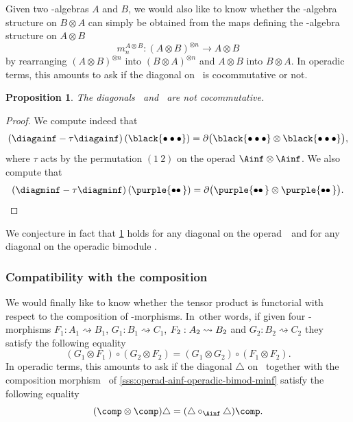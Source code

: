 \documentclass[JEP,XML,SOM,NoFloatCountersInSection,Unicode,published]{cedram}
\newcommand{\twobullets}{\bullet\bullet\mkern3mu}
\theoremstyle{definition}
\theoremstyle{plain}
\newtheorem{proposition}[definition]{Proposition}
\begin{document}
Given two \Ainf -algebras $A$ and $B$, we would also like to know whether the \Ainf\nobreakdash-alge\-bra structure on $B \otimes A$ can simply be obtained from the maps defining the \Ainf\nobreakdash-alge\-bra structure on $A \otimes B$
\[
m_n^{A \otimes B} : (A \otimes B)^{\otimes n} \to A \otimes B
\]
by rearranging $(A \otimes B)^{\otimes n}$ into $(B \otimes A)^{\otimes n}$ and $A \otimes B$ into $B \otimes A$.
In operadic terms, this amounts to ask if the diagonal on \Ainf\ is cocommutative or not.

\begin{proposition} \label{prop:not-cocomm}
The diagonals \diagainf\ and \diagminf\ are not cocommutative.
\end{proposition}

\begin{proof}
We compute indeed that
\[
\left(\diagainf - \tau \diagainf \right) \left(\black{ \bullet \bullet \bullet } \right) = \partial \bigl(\black{ \bullet \bullet \bullet } \otimes \black{ \bullet \bullet \bullet } \bigr),
\]
where $\tau$ acts by the permutation $(1 \ 2)$ on the operad $\Ainf \otimes \Ainf$.
We also compute that
\[
\left(\diagminf - \tau \diagminf \right) \left(\purple{\twobullets} \right) = \partial \bigl(\purple{\twobullets} \otimes \purple{\twobullets} \bigr).\qedhere
\]
\end{proof}

We conjecture in fact that \cref{prop:not-cocomm} holds for any diagonal on the operad~\Ainf\ and for any diagonal on the operadic bimodule \Minf.

\subsubsection{Compatibility with the composition} \label{sss:comp-composition}

We would finally like to know whether the tensor product is functorial with respect to the composition of \Ainf -morphisms.
In~other words, if given four \Ainf -morphisms $F_1 : A_1 \rightsquigarrow B_1$,
$G_1 : B_1 \rightsquigarrow C_1$, $F_2 : A_2 \rightsquigarrow\nobreak B_2$ and
$G_2 : B_2 \rightsquigarrow C_2$ they satisfy the following equality
\[
(G_1 \otimes F_1) \circ (G_2 \otimes F_2) = (G_1 \otimes G_2) \circ (F_1 \otimes F_2).
\]
In operadic terms, this amounts to ask if the diagonal $\triangle$ on \Minf\ together with the composition morphism \comp\ of \cref{sss:operad-ainf-operadic-bimod-minf} satisfy the following equality
\[
(\comp \otimes \comp) \triangle = (\triangle \circ_{\Ainf} \triangle) \comp.
\]
\end{document}
